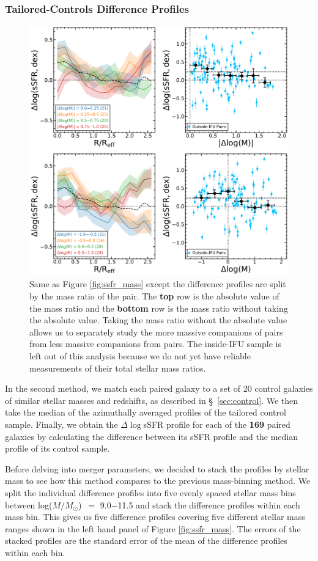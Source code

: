 \documentclass[iop,revtex4,twocolumn,apj,numberedappendix,appendixfloats]{emulateapj}
\newcommand{\logm}{log($M/M_{\odot}$)}
\begin{document}
\subsubsection{Tailored-Controls Difference Profiles}\label{sec:tailored}
\begin{figure}
\centering
\includegraphics[width=0.8\linewidth]{fig/ssfr_dm.pdf}
\caption[]{Same as Figure \ref{fig:ssfr_mass} except the difference profiles are split by the mass ratio of the pair. The \textbf{top} row is the absolute value of the mass ratio and the \textbf{bottom} row is the mass ratio without taking the absolute value. Taking the mass ratio without the absolute value allows us to separately study the more massive companions of pairs from less massive companions from pairs. The inside-IFU sample is left out of this analysis because we do not yet have reliable measurements of their total stellar mass ratios.}
\label{fig:ssfr_dm}
\end{figure}
In the second method, we match each paired galaxy to a set of 20 control galaxies of similar stellar masses and redshifts, as described in \S~\ref{sec:control}. We then take the median of the azimuthally averaged profiles of the tailored control sample. Finally, we obtain the $\Delta\log$sSFR profile for each of the \textbf{169} paired galaxies by calculating the difference between its sSFR profile and the median profile of its control sample.

Before delving into merger parameters, we decided to stack the profiles by stellar mass to see how this method compares to the previous mass-binning method. We split the individual difference profiles into five evenly spaced stellar mass bins between \logm\ $=$ 9.0$-$11.5 and stack the difference profiles within each mass bin. This gives us five difference profiles covering five different stellar mass ranges shown in the left hand panel of Figure \ref{fig:ssfr_mass}. The errors of the stacked profiles are the standard error of the mean of the difference profiles within each bin.
\end{document}
